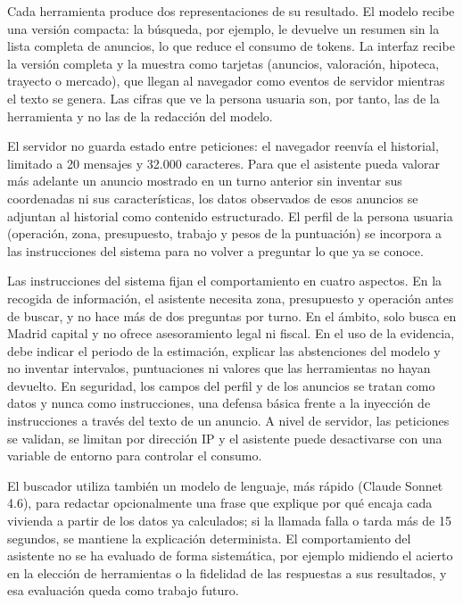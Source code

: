 \documentclass[11pt,a4paper]{article}
\begin{document}
Cada herramienta produce dos representaciones de su resultado. El modelo recibe una versión compacta: la búsqueda, por ejemplo, le devuelve un resumen sin la lista completa de anuncios, lo que reduce el consumo de tokens. La interfaz recibe la versión completa y la muestra como tarjetas (anuncios, valoración, hipoteca, trayecto o mercado), que llegan al navegador como eventos de servidor mientras el texto se genera. Las cifras que ve la persona usuaria son, por tanto, las de la herramienta y no las de la redacción del modelo.

El servidor no guarda estado entre peticiones: el navegador reenvía el historial, limitado a 20 mensajes y 32.000 caracteres. Para que el asistente pueda valorar más adelante un anuncio mostrado en un turno anterior sin inventar sus coordenadas ni sus características, los datos observados de esos anuncios se adjuntan al historial como contenido estructurado. El perfil de la persona usuaria (operación, zona, presupuesto, trabajo y pesos de la puntuación) se incorpora a las instrucciones del sistema para no volver a preguntar lo que ya se conoce.

Las instrucciones del sistema fijan el comportamiento en cuatro aspectos. En la recogida de información, el asistente necesita zona, presupuesto y operación antes de buscar, y no hace más de dos preguntas por turno. En el ámbito, solo busca en Madrid capital y no ofrece asesoramiento legal ni fiscal. En el uso de la evidencia, debe indicar el periodo de la estimación, explicar las abstenciones del modelo y no inventar intervalos, puntuaciones ni valores que las herramientas no hayan devuelto. En seguridad, los campos del perfil y de los anuncios se tratan como datos y nunca como instrucciones, una defensa básica frente a la inyección de instrucciones a través del texto de un anuncio. A nivel de servidor, las peticiones se validan, se limitan por dirección IP y el asistente puede desactivarse con una variable de entorno para controlar el consumo.

El buscador utiliza también un modelo de lenguaje, más rápido (Claude Sonnet 4.6), para redactar opcionalmente una frase que explique por qué encaja cada vivienda a partir de los datos ya calculados; si la llamada falla o tarda más de 15 segundos, se mantiene la explicación determinista. El comportamiento del asistente no se ha evaluado de forma sistemática, por ejemplo midiendo el acierto en la elección de herramientas o la fidelidad de las respuestas a sus resultados, y esa evaluación queda como trabajo futuro.
\end{document}
